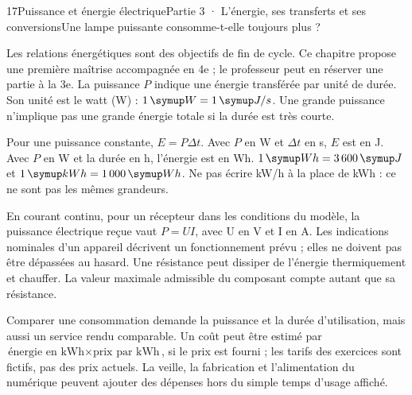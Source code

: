 \begin{ouverture}[college3]{17}{Puissance et énergie électrique}{Partie 3 · L’énergie, ses transferts et ses conversions}{Une lampe puissante consomme-t-elle toujours plus ?}
\end{ouverture}
\label{ess-17}
Les relations énergétiques sont des objectifs de fin de cycle. Ce chapitre propose une première maîtrise accompagnée en 4e ; le professeur peut en réserver une partie à la 3e. La puissance $P$ indique une énergie transférée par unité de durée. Son unité est le watt (W) : $1\unite W=1\unite{J/s}$. Une grande puissance n’implique pas une grande énergie totale si la durée est très courte.\par
{}
Pour une puissance constante, $E=P\Delta t$. Avec $P$ en W et $\Delta t$ en s, $E$ est en J. Avec $P$ en W et la durée en h, l’énergie est en Wh. $1\unite{Wh}=3\,600\unite J$ et $1\unite{kWh}=1\,000\unite{Wh}$. Ne pas écrire kW/h à la place de kWh : ce ne sont pas les mêmes grandeurs.\par
\clearpage
{}
En courant continu, pour un récepteur dans les conditions du modèle, la puissance électrique reçue vaut $P=UI$, avec U en V et I en A. Les indications nominales d’un appareil décrivent un fonctionnement prévu ; elles ne doivent pas être dépassées au hasard. Une résistance peut dissiper de l’énergie thermiquement et chauffer. La valeur maximale admissible du composant compte autant que sa résistance.\par
{}
Comparer une consommation demande la puissance et la durée d’utilisation, mais aussi un service rendu comparable. Un coût peut être estimé par $\text{énergie en kWh}\times\text{prix par kWh}$, si le prix est fourni ; les tarifs des exercices sont fictifs, pas des prix actuels. La veille, la fabrication et l’alimentation du numérique peuvent ajouter des dépenses hors du simple temps d’usage affiché.\par
